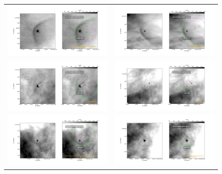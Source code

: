 \documentclass{article}
\begin{document}
\begin{figure}[htp]
\centering
\begin{tabular}{l l}
  
   \includegraphics[width=0.5\linewidth]{j8oc01010_wcs/w069-601-Bally_01-images.pdf}
   &\includegraphics[width=0.5\linewidth]{j8oc01010_wcs/w073-227-Bally_01-images.pdf}\\
    \includegraphics[width=0.5\linewidth]{j8oc01010_wcs/142-301-Bally_01-images.pdf}
    &\includegraphics[width=0.5\linewidth]{j8oc02010_wcs/131-046-Bally_02-images.pdf}\\
    \includegraphics[width=0.5\linewidth]{j8oc02010_wcs/132-053-Bally_02-images.pdf}
   &\includegraphics[width=0.5\linewidth]{j8oc02010_wcs/206-043-Bally_02-images.pdf}\\
\end{tabular}
\end{figure}
\end{document}
